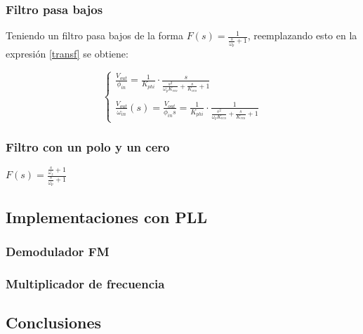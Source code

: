 	\subsubsection{Filtro pasa bajos}
	
	Teniendo un filtro pasa bajos de la forma $F(s) = \frac{1}{\frac{s}{\omega_p} + 1}$, reemplazando esto en la expresi\'on \ref{transf} se obtiene:
	
	\begin{equation}
	\begin{cases}
	\frac{V_{out}}{\phi_{in}} = \frac{1}{K_{phi}}\cdot \frac{s}{\frac{s^2}{\omega_p K_{vco}}+\frac{s}{K_{vco}} + 1}\\ \\
	\frac{V_{out}}{\omega_{in}} (s)=\frac{V_{out}}{\phi_{in}s} = \frac{1}{K_{phi}}\cdot \frac{1}{\frac{s^2}{\omega_p K_{vco}}+\frac{s}{K_{vco}} + 1}
	\end{cases}
	\label{transf2}
	\end{equation}
	
	\subsubsection{Filtro con un polo y un cero}
	$F(s) = \frac{\frac{s}{\omega_z} + 1}{\frac{s}{\omega_p} + 1}$

\subsection{Implementaciones con PLL}

	\subsubsection{Demodulador FM }
	
	\subsubsection{Multiplicador de frecuencia}

\subsection{Conclusiones}